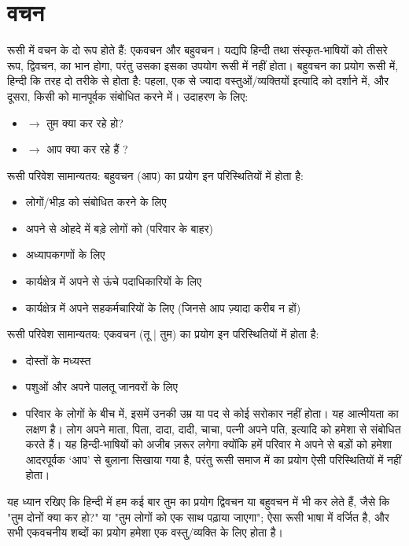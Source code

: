 \section{वचन}\label{sec:intro-plurals}
  रूसी में वचन के दो रूप होते हैं: एकवचन और बहुवचन। यद्यपि हिन्दी तथा संस्कृत-भाषियों को तीसरे रूप, द्विवचन, का भान होगा, परंतु उसका इसका उपयोग रूसी में नहीं होता।
  बहुवचन का प्रयोग रूसी में, हिन्दी कि तरह दो तरीके से होता है: पहला, एक से ज्यादा वस्तुओं/व्यक्तियों इत्यादि को दर्शाने में, और दूसरा, किसी को मानपूर्वक संबोधित करने में।
  उदाहरण के लिए:
  \begin{itemize}
    \item  {} $\rightarrow$ तुम क्या कर रहे हो?
    \item  {} $\rightarrow$ आप क्या कर रहे हैं ?
  \end{itemize}


  रूसी परिवेश सामान्यतय: बहुवचन  (आप) का प्रयोग इन परिस्थितियों में होता है:
  \begin{itemize}
    \item लोगों/भीड़ को संबोधित करने के लिए
    \item अपने से ओहदे में बड़े लोगों को (परिवार के बाहर)
    \item अध्यापकगणों के लिए
    \item कार्यक्षेत्र में अपने से ऊंचे पदाधिकारियों के लिए
    \item कार्यक्षेत्र में अपने सहकर्मचारियों के लिए (जिनसे आप ज़्यादा करीब न हों)
  \end{itemize}

  रूसी परिवेश सामान्यतय: एकवचन  (तू | तुम) का प्रयोग इन परिस्थितियों में होता है:
  \begin{itemize}
    \item दोस्तों के मध्यस्त
    \item पशुओं और अपने पालतू जानवरों के लिए
    \item  परिवार के लोगों के बीच में, इसमें उनकी उम्र या पद से कोई सरोकार नहीं होता। यह आत्मीयता का लक्षण है। लोग अपने माता, पिता,
    दादा, दादी, चाचा, पत्नी अपने पति, इत्यादि को हमेशा  से संबोधित करते हैं। यह हिन्दी-भाषियों को अजीब ज़रूर लगेगा क्योंकि हमें परिवार मे अपने से बड़ों को हमेशा आदरपूर्वक `आप'
    से बुलाना सिखाया गया है, परंतु रूसी समाज में  का प्रयोग ऐसी परिस्थितियों में नहीं होता।
  \end{itemize}
  यह ध्यान रखिए कि हिन्दी में हम कई बार तुम का प्रयोग द्विवचन या बहुवचन में भी कर लेते हैं, जैसे कि "तुम दोनों क्या कर हो?" या "तुम लोगों को एक साथ पढ़ाया जाएगा";
  ऐसा रूसी भाषा में वर्जित है,  और सभी एकवचनीय शब्दों का प्रयोग हमेशा एक वस्तु/व्यक्ति के लिए होता है।
